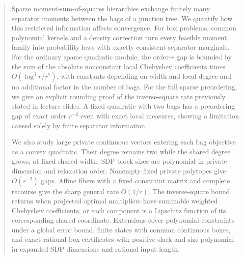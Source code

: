 \begin{abstract}
Sparse moment-sum-of-squares hierarchies exchange finitely many separator
moments between the bags of a junction tree. We quantify how this restricted
information affects convergence. For box problems, common polynomial
kernels and a density correction turn every feasible moment family into
probability laws with exactly consistent separator marginals. For the
ordinary sparse quadratic module, the order-$r$ gap is bounded by the sum
of the absolute nonconstant local Chebyshev coefficients times
$O(\log^3 r/r^2)$, with constants depending on width and local degree and
no additional factor in the number of bags. For the full sparse
preordering, we give an explicit rounding proof of the inverse-square rate
previously stated in lecture slides. A fixed quadratic with two bags has a
preordering gap of exact order $r^{-2}$ even with exact local measures,
showing a limitation caused solely by finite separator information.

We also study large private continuous vectors entering each bag objective
as a convex quadratic. Their degree remains two while the shared degree
grows; at fixed shared width, SDP block sizes are polynomial in private
dimension and relaxation order. Nonempty fixed private polytopes give
$O(r^{-2})$ gaps. Affine fibers with a fixed constraint matrix and complete
recourse give the sharp general rate $O(1/r)$. The inverse-square bound
returns when projected optimal multipliers have summable weighted
Chebyshev coefficients, or each component is a Lipschitz function of its
corresponding shared coordinate.
Extensions cover polynomial constraints under a global error bound,
finite states with common continuous boxes, and exact rational box
certificates with positive slack and size polynomial in expanded SDP
dimensions and rational input length.
\end{abstract}
